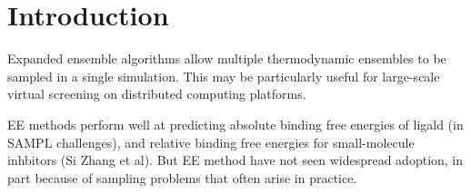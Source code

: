 \documentclass[%
 aip,
rsi,%
 amsmath,amssymb,
 reprint,%
]{revtex4-1}
\begin{document}
\maketitle


\section*{Introduction}


Expanded ensemble algorithms allow multiple thermodynamic ensembles to be sampled in a single simulation.   This may be particularly useful for large-scale virtual screening on distributed computing platforms.

EE methods perform well at predicting absolute binding free energies of ligald (in SAMPL challenges), and relative binding free energies for small-molecule inhbitors (Si Zhang et al).   But EE method have not seen widespread adoption, in part because of sampling problems that often arise in practice.
\end{document}
